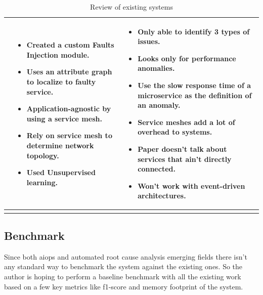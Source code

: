 \begin{longtable}{| p{25mm} | p{62mm} | p{62mm} |}
    \cite{wu2020microrca} &
    \vspace{-8mm}
    \begin{itemize}[leftmargin=3mm,noitemsep,nolistsep] 
        \item Created a custom Faults Injection module.
        \item Uses an attribute graph to localize to faulty service.
        \item Application-agnostic by using a service mesh.
        \item Rely on service mesh to determine network topology.
        \item Used Unsupervised learning.
        \vspace{-7mm}
    \end{itemize} &
    \vspace{-8mm}
    \begin{itemize}[leftmargin=3mm,noitemsep,nolistsep] 
        \item Only able to identify 3 types of issues.
        \item Looks only for performance anomalies.
        \item Use the slow response time of a microservice as the definition of an anomaly.
        \item Service meshes add a lot of overhead to systems.
        \item Paper doesn't talk about services that ain't directly connected.
        \item Won't work with event-driven architectures.
        \vspace{-7mm}
    \end{itemize} \\ \hline
    
    \caption{Review of existing systems}
\end{longtable}


\subsection{Benchmark}
Since both \ac{aiops} and automated root cause analysis emerging fields  there isn't any standard way to benchmark the system against the existing ones. So the author is hoping to perform a baseline benchmark with all the existing work based on a few key metrics like f1-score and memory footprint of the system.